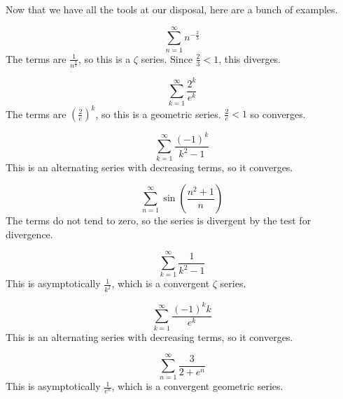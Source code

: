 \documentclass[fleqn]{report}
\begin{document}
Now that we have all the tools at our disposal, here are a
bunch of examples.

\begin{example}
\begin{equation*}
\sum_{n=1}^\infty n^{-\frac{2}{3}}
\end{equation*}
The terms are $\frac{1}{n^{\frac{2}{3}}}$, so this is a
$\zeta$ series. Since $\frac{2}{3} < 1$, this diverges.
\end{example}

\begin{example}
\begin{equation*}
\sum_{k=1}^\infty \frac{2^k}{e^k}
\end{equation*}
The terms are $\left( \frac{2}{e} \right)^k$, so this is a
geometric series. $\frac{2}{e} < 1$ so converges.
\end{example}

\begin{example}
\begin{equation*}
\sum_{k=1}^\infty \frac{(-1)^k}{k^2-1}
\end{equation*}
This is an alternating series with decreasing terms, so it
converges.
\end{example}

\begin{example}
\begin{equation*}
\sum_{n=1}^\infty \sin \left( \frac{n^2+1}{n} \right)
\end{equation*}
The terms do not tend to zero, so the series is divergent by
the test for divergence.
\end{example}

\begin{example}
\begin{equation*}
\sum_{k=1}^\infty \frac{1}{k^2-1}
\end{equation*}
This is asymptotically $\frac{1}{k^2}$, which is a convergent
$\zeta$ series.
\end{example}

\begin{example}
\begin{equation*}
\sum_{k=1}^\infty \frac{(-1)^k k}{e^k}
\end{equation*}
This is an alternating series with decreasing terms, so it
converges.
\end{example}

\begin{example}
\begin{equation*}
\sum_{n=1}^\infty \frac{3}{2 + e^n}
\end{equation*}
This is asymptotically $\frac{1}{e^n}$, which is a convergent
geometric series.
\end{example}
\end{document}

